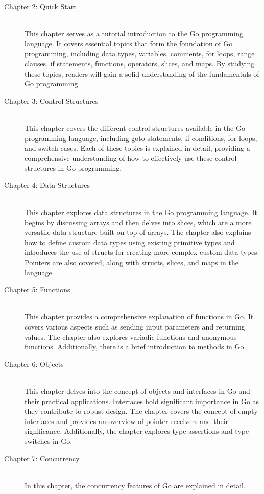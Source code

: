 \begin{description}
\item[Chapter 2: Quick Start] \hfill \\
This chapter serves as a tutorial introduction to the Go programming language.
It covers essential topics that form the foundation of Go programming, including
data types, variables, comments, for loops, range clauses, if statements,
functions, operators, slices, and maps. By studying these topics, readers will
gain a solid understanding of the fundamentals of Go programming.
\item[Chapter 3: Control Structures] \hfill \\
This chapter covers the different control structures available in the Go
programming language, including goto statements, if conditions, for loops, and
switch cases. Each of these topics is explained in detail, providing a
comprehensive understanding of how to effectively use these control structures
in Go programming.
\item[Chapter 4: Data Structures] \hfill \\
This chapter explores data structures in the Go programming language. It begins
by discussing arrays and then delves into slices, which are a more versatile
data structure built on top of arrays. The chapter also explains how to define
custom data types using existing primitive types and introduces the use of
structs for creating more complex custom data types. Pointers are also covered,
along with structs, slices, and maps in the language.
\item[Chapter 5: Functions] \hfill \\
This chapter provides a comprehensive explanation of functions in Go. It covers
various aspects such as sending input parameters and returning values. The
chapter also explores variadic functions and anonymous functions. Additionally,
there is a brief introduction to methods in Go.
\item[Chapter 6: Objects] \hfill \\
This chapter delves into the concept of objects and interfaces in Go and their
practical applications. Interfaces hold significant importance in Go as they
contribute to robust design. The chapter covers the concept of empty interfaces
and provides an overview of pointer receivers and their significance.
Additionally, the chapter explores type assertions and type switches in Go.
\item[Chapter 7: Concurrency] \hfill \\
In this chapter, the concurrency features of Go are explained in detail.

\end{description}
